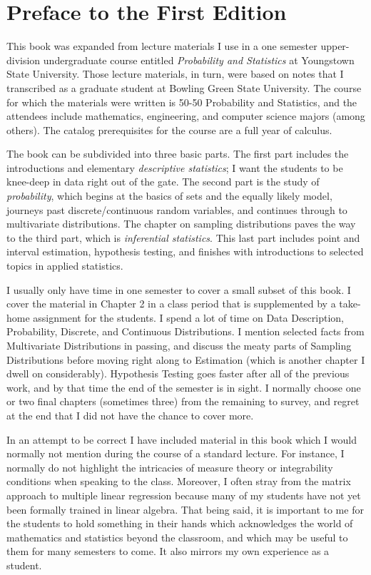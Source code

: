 
\cleardoublepage
{}
{}

\chapter*{Preface to the First Edition}

This book was expanded from lecture materials I use in a one semester upper-division undergraduate course entitled \emph{Probability and Statistics} at Youngstown State University. Those lecture materials, in turn, were based on notes that I transcribed as a graduate student at Bowling Green State University. The course for which the materials were written is 50-50 Probability and Statistics, and the attendees include mathematics, engineering, and computer science majors (among others). The catalog prerequisites for the course are a full year of calculus.

The book can be subdivided into three basic parts. The first part includes the introductions and elementary \emph{descriptive statistics}; I want the students to be knee-deep in data right out of the gate. The second part is the study of \emph{probability}, which begins at the basics of sets and the equally likely model, journeys past discrete/continuous  random variables, and continues through to multivariate distributions. The chapter on sampling distributions paves the way to the third part, which is \emph{inferential statistics}. This last part includes point and interval estimation, hypothesis testing, and finishes with introductions to selected topics in applied statistics.

I usually only have time in one semester to cover a small subset of this book. I cover the material in Chapter 2 in a class period that is supplemented by a take-home assignment for the students. I spend a lot of time on Data Description, Probability, Discrete, and Continuous Distributions. I mention selected facts from Multivariate Distributions in passing, and discuss the meaty parts of Sampling Distributions before moving right along to Estimation (which is another chapter I dwell on considerably). Hypothesis Testing goes faster after all of the previous work, and by that time the end of the semester is in sight. I normally choose one or two final chapters (sometimes three) from the remaining to survey, and regret at the end that I did not have the chance to cover more.

In an attempt to be correct I have included material in this book which I would normally not mention during the course of a standard lecture. For instance, I normally do not highlight the intricacies of measure theory or integrability conditions when speaking to the class. Moreover, I often stray from the matrix approach to multiple linear regression because many of my students have not yet been formally trained in linear algebra. That being said, it is important to me for the students to hold something in their hands which acknowledges the world of mathematics and statistics beyond the classroom, and which may be useful to them for many semesters to come. It also mirrors my own experience as a student.


